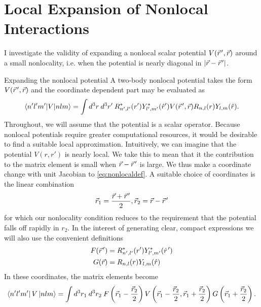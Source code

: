 

\chapter{\label{chap:localExpansion}Local Expansion of Nonlocal Interactions}


I investigate the validity of expanding a nonlocal scalar potential $V(\vec{r}\mkern2mu',\vec{r})$ around a small nonlocality, i.e. when the potential is nearly diagonal in $|\vec{r}-\vec{r}\mkern2mu'|$. 


\begin{section}{Expanding the nonlocal potential}
A two-body nonlocal potential takes the form $V(\vec{r}\mkern2mu',\vec{r})$ and the coordinate dependent part may be evaluated as
\begin{equation}\label{eq:nonlocaldef}
\braket{n' l' m'| V | n l m}=\int d^3r\:d^3r'\:R^*_{n',l'}(r') Y^*_{l',m'}(\hat{r}') V(\vec{r}\mkern2mu',\vec{r}) R_{n,l}(r) Y_{l,m}(\hat{r}).
\end{equation}
Throughout, we will assume that the potential is a scalar operator. Because nonlocal potentials require greater computational resources, it would be desirable to find a suitable local approximation. Intuitively, we can imagine that the potential $V(r,r')$ is nearly local. We take this to mean that it the contribution to the matrix element is small when $\vec{r}-\vec{r}\mkern2mu'$ is large. We thus make a coordinate change with unit Jacobian to \eqref{eq:nonlocaldef}. A suitable choice of coordinates is the linear combination
\begin{equation}\label{eq:coords}
\vec{r}_1=\frac{\vec{r}+\vec{r}\mkern2mu'}{2},\vec{r}_2=\vec{r}-\vec{r}\mkern2mu'
\end{equation}
for which our nonlocality condition reduces to the requirement that the potential falls off rapidly in $r_2$. In the interest of generating clear, compact expressions we will also use the convenient definitions
\begin{align}
F(\vec{r}\mkern2mu')&=R^*_{n',l'}(r') Y^*_{l',m'}(\hat{r}\mkern2mu')\\
G(\vec{r})&=R_{n,l}(r) Y_{l,m}(\hat{r})
\end{align}
In these coordinates, the matrix elements become 
\begin{equation}
\bra{n' l' m'} V \ket{ n l m}= \int d^3r_1\:d^3r_2\:F\left( \vec{r}_1-\frac{\vec{r}_2}{2} \right) V\left(\vec{r}_1-\frac{\vec{r}_2}{2},\vec{r}_1+\frac{\vec{r}_2}{2}\right) 
G\left( \vec{r}_1+\frac{\vec{r}_2}{2}\right).
\end{equation}

\end{section}
